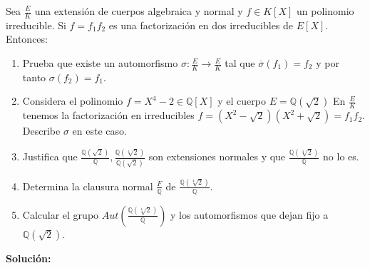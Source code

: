 \begin{exercise}
Sea $\frac{E}{K}$ una extensión de cuerpos algebraica y normal y $f \in K[X]$ un polinomio irreducible. Si $f = f_1f_2$ es una factorización en dos irreducibles de $E[X]$. Entonces:

\begin{enumerate}
\item Prueba que existe un automorfismo $\sigma:\frac{E}{K} \to \frac{E}{K}$ tal que $\overline{\sigma}(f_1) = f_2$ y por tanto $\sigma(f_2) = f_1$. 
\item Considera el polinomio $f = X^4 - 2 \in \mathbb{Q}[X]$ y el cuerpo $E = \mathbb{Q}(\sqrt{2})$ En $\frac{E}{K}$ tenemos la factorización en irreducibles $f = (X^2 - \sqrt{2})(X^2+\sqrt{2}) = f_1f_2$. Describe $\sigma$ en este caso. 
\item Justifica que $\frac{\mathbb{Q}(\sqrt{2})}{\mathbb{Q}}, \frac{\mathbb{Q}(\sqrt[4]{2})}{\mathbb{Q}(\sqrt{2})}$ son extensiones normales y que $\frac{\mathbb{Q}(\sqrt[4]{2})}{\mathbb{Q}}$ no lo es.
\item Determina la clausura normal $\frac{F}{\mathbb{Q}}$ de $\frac{\mathbb{Q}(\sqrt[4]{2})}{\mathbb{Q}}$.
\item Calcular el grupo $Aut(\frac{\mathbb{Q}(\sqrt[4]{2})}{\mathbb{Q}})$ y los automorfismos que dejan fijo a $\mathbb{Q}(\sqrt{2})$. 
\end{enumerate}
\end{exercise}
\textbf{Solución:}
